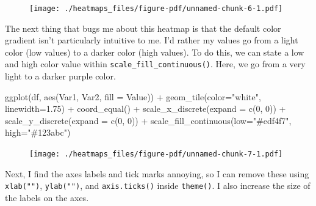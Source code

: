 \documentclass[
  letterpaper,
  DIV=11,
  numbers=noendperiod]{scrreprt}
\newenvironment{Shaded}{\begin{snugshade}}{\end{snugshade}}
\newcommand{\AttributeTok}[1]{\textcolor[rgb]{0.40,0.45,0.13}{#1}}
\newcommand{\DecValTok}[1]{\textcolor[rgb]{0.68,0.00,0.00}{#1}}
\newcommand{\FloatTok}[1]{\textcolor[rgb]{0.68,0.00,0.00}{#1}}
\newcommand{\FunctionTok}[1]{\textcolor[rgb]{0.28,0.35,0.67}{#1}}
\newcommand{\NormalTok}[1]{\textcolor[rgb]{0.00,0.23,0.31}{#1}}
\newcommand{\SpecialCharTok}[1]{\textcolor[rgb]{0.37,0.37,0.37}{#1}}
\newcommand{\StringTok}[1]{\textcolor[rgb]{0.13,0.47,0.30}{#1}}
\begin{document}
\begin{figure}[H]

{\centering \texttt{[image: ./heatmaps\_files/figure-pdf/unnamed-chunk-6-1.pdf]}

}

\end{figure}

The next thing that bugs me about this heatmap is that the default color
gradient isn't particularly intuitive to me. I'd rather my values go
from a light color (low values) to a darker color (high values). To do
this, we can state a low and high color value within
\texttt{scale\_fill\_continuous()}. Here, we go from a very light to a
darker purple color.

\begin{Shaded}
\begin{Highlighting}[]
\FunctionTok{ggplot}\NormalTok{(df, }\FunctionTok{aes}\NormalTok{(Var1, Var2, }\AttributeTok{fill =}\NormalTok{ Value)) }\SpecialCharTok{+} 
  \FunctionTok{geom\_tile}\NormalTok{(}\AttributeTok{color=}\StringTok{"white"}\NormalTok{, }\AttributeTok{linewidth=}\FloatTok{1.75}\NormalTok{) }\SpecialCharTok{+}
  \FunctionTok{coord\_equal}\NormalTok{() }\SpecialCharTok{+}
  \FunctionTok{scale\_x\_discrete}\NormalTok{(}\AttributeTok{expand =} \FunctionTok{c}\NormalTok{(}\DecValTok{0}\NormalTok{, }\DecValTok{0}\NormalTok{)) }\SpecialCharTok{+}
  \FunctionTok{scale\_y\_discrete}\NormalTok{(}\AttributeTok{expand =} \FunctionTok{c}\NormalTok{(}\DecValTok{0}\NormalTok{, }\DecValTok{0}\NormalTok{)) }\SpecialCharTok{+} 
  \FunctionTok{scale\_fill\_continuous}\NormalTok{(}\AttributeTok{low=}\StringTok{"\#edf4f7"}\NormalTok{, }\AttributeTok{high=}\StringTok{"\#123abc"}\NormalTok{)}
\end{Highlighting}
\end{Shaded}

\begin{figure}[H]

{\centering \texttt{[image: ./heatmaps\_files/figure-pdf/unnamed-chunk-7-1.pdf]}

}

\end{figure}

Next, I find the axes labels and tick marks annoying, so I can remove
these using \texttt{xlab("")}, \texttt{ylab("")}, and
\texttt{axis.ticks()} inside \texttt{theme()}. I also increase the size
of the labels on the axes.
\end{document}
